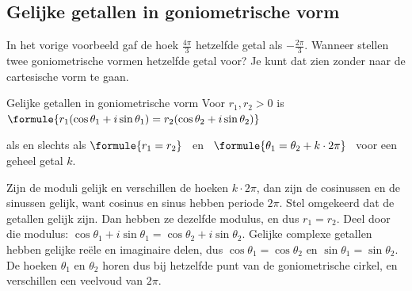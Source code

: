 
\begin{oefeningen}
\end{oefeningen}

\subsection{Gelijke getallen in goniometrische vorm}

In het vorige voorbeeld gaf de hoek $\frac{4\pi}{3}$ hetzelfde getal als $-\frac{2\pi}{3}$. Wanneer stellen twee goniometrische vormen hetzelfde getal voor? Je kunt dat zien zonder naar de cartesische vorm te gaan.

\begin{theorie}
\begin{stelling}{Gelijke getallen in goniometrische vorm}
Voor $r_1, r_2 > 0$ is \quad $\formule{r_1(\cos\theta_1 + i\sin\theta_1) = r_2(\cos\theta_2 + i\sin\theta_2)}$

\vspace{1mm}
als en slechts als \quad $\formule{r_1 = r_2}$ \ en \ $\formule{\theta_1 = \theta_2 + k \cdot 2\pi}$ \ voor een geheel getal $k$.
\end{stelling}

\begin{bewijs}
Zijn de moduli gelijk en verschillen de hoeken $k \cdot 2\pi$, dan zijn de cosinussen en de sinussen gelijk, want cosinus en sinus hebben periode $2\pi$. Stel omgekeerd dat de getallen gelijk zijn. Dan hebben ze dezelfde modulus, en
dus $r_1 = r_2$. Deel door die modulus: $\cos\theta_1 + i\sin\theta_1 = \cos\theta_2 + i\sin\theta_2$. Gelijke complexe getallen hebben gelijke reële en imaginaire delen, dus $\cos\theta_1 = \cos\theta_2$ en $\sin\theta_1 = \sin\theta_2$. De hoeken $\theta_1$ en $\theta_2$ horen dus bij hetzelfde punt van de goniometrische cirkel, en verschillen een veelvoud van $2\pi$.
\end{bewijs}
\end{theorie}

